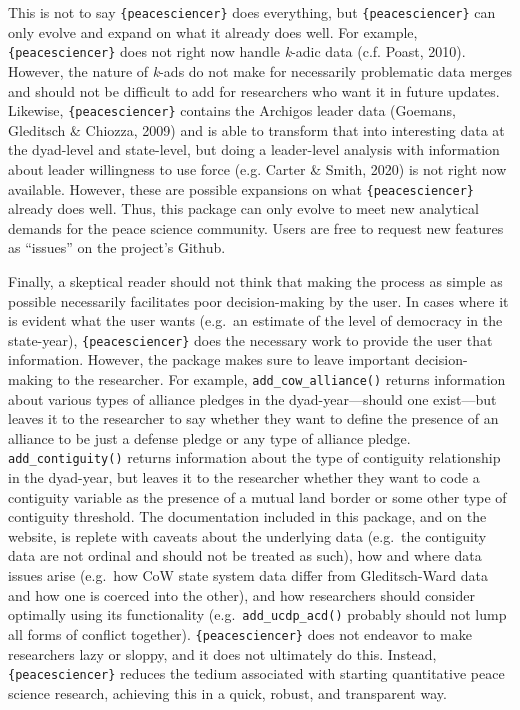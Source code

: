 \documentclass[
  11pt,
]{article}
\begin{document}
This is not to say \texttt{\{peacesciencer\}} does everything, but \texttt{\{peacesciencer\}} can only evolve and expand on what it already does well. For example, \texttt{\{peacesciencer\}} does not right now handle \emph{k}-adic data (c.f. Poast, 2010). However, the nature of \emph{k}-ads do not make for necessarily problematic data merges and should not be difficult to add for researchers who want it in future updates. Likewise, \texttt{\{peacesciencer\}} contains the Archigos leader data (Goemans, Gleditsch \& Chiozza, 2009) and is able to transform that into interesting data at the dyad-level and state-level, but doing a leader-level analysis with information about leader willingness to use force (e.g. Carter \& Smith, 2020) is not right now available. However, these are possible expansions on what \texttt{\{peacesciencer\}} already does well. Thus, this package can only evolve to meet new analytical demands for the peace science community. Users are free to request new features as ``issues'' on the project's Github.

Finally, a skeptical reader should not think that making the process as simple as possible necessarily facilitates poor decision-making by the user. In cases where it is evident what the user wants (e.g.~an estimate of the level of democracy in the state-year), \texttt{\{peacesciencer\}} does the necessary work to provide the user that information. However, the package makes sure to leave important decision-making to the researcher. For example, \texttt{add\_cow\_alliance()} returns information about various types of alliance pledges in the dyad-year---should one exist---but leaves it to the researcher to say whether they want to define the presence of an alliance to be just a defense pledge or any type of alliance pledge. \texttt{add\_contiguity()} returns information about the type of contiguity relationship in the dyad-year, but leaves it to the researcher whether they want to code a contiguity variable as the presence of a mutual land border or some other type of contiguity threshold. The documentation included in this package, and on the website, is replete with caveats about the underlying data (e.g.~the contiguity data are not ordinal and should not be treated as such), how and where data issues arise (e.g.~how CoW state system data differ from Gleditsch-Ward data and how one is coerced into the other), and how researchers should consider optimally using its functionality (e.g.~\texttt{add\_ucdp\_acd()} probably should not lump all forms of conflict together). \texttt{\{peacesciencer\}} does not endeavor to make researchers lazy or sloppy, and it does not ultimately do this. Instead, \texttt{\{peacesciencer\}} reduces the tedium associated with starting quantitative peace science research, achieving this in a quick, robust, and transparent way.
\end{document}
